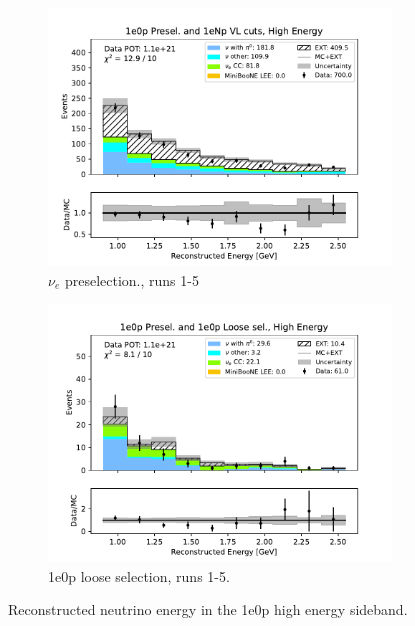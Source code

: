 \begin{figure}[H]
\begin{subfigure}{0.5\linewidth}
    \includegraphics[width=\linewidth]{technote/Sidebands/Figures/FarSideband/far_sideband_reco_e_run1234b4c4d5_ZP_ZP_HIGH_ENERGY.pdf}
    \caption{$\nu_e$ preselection., runs 1-5}
    \end{subfigure}%
    \begin{subfigure}{0.5\linewidth}
    \includegraphics[width=\linewidth]{technote/Sidebands/Figures/FarSideband/far_sideband_reco_e_run1234b4c4d5_ZP_ZPLOOSESEL_HIGH_ENERGY.pdf}
    \caption{1e0p loose selection, runs 1-5.}
    \end{subfigure}
    \caption{Reconstructed neutrino energy in the 1e0p high energy sideband.}
    \label{fig:HighEnergy1eNp_nonpi0_score}
\end{figure}

